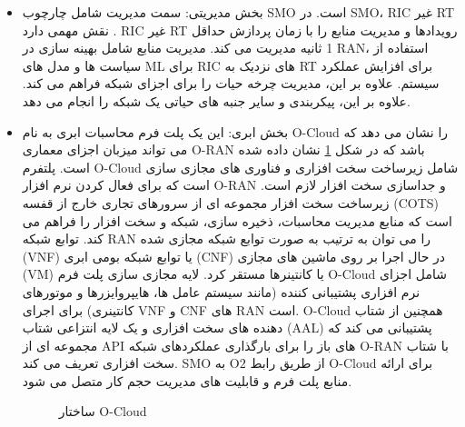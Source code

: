 \begin{itemize}
\item بخش مدیریتی:
سمت مدیریت شامل چارچوب SMO است. در SMO، RIC غیر RT نقش مهمی دارد \cite{ORANArch}.
RIC غیر RT رویدادها و مدیریت منابع را با زمان پردازش حداقل 1 ثانیه مدیریت می کند. مدیریت منابع شامل
بهینه سازی در RAN، استفاده از سیاست ها و مدل های ML برای RIC های نزدیک به RT برای افزایش عملکرد سیستم.
علاوه بر این، مدیریت چرخه حیات را برای اجزای شبکه فراهم می کند. علاوه بر این، پیکربندی و سایر جنبه های حیاتی یک شبکه را انجام می دهد.
\item بخش ابری:
این یک پلت فرم محاسبات ابری به نام O-Cloud را نشان می دهد که می تواند میزبان اجزای معماری O-RAN باشد که در شکل \ref{fig:g12} نشان داده شده است.
پلتفرم O-Cloud شامل زیرساخت سخت افزاری و فناوری های مجازی سازی است که برای فعال کردن نرم افزار O-RAN و جداسازی سخت افزار \cite{ORANSecOcloud} لازم است. زیرساخت سخت افزار مجموعه ای از سرورهای تجاری خارج از قفسه (COTS) است که منابع مدیریت محاسبات، ذخیره سازی، شبکه و سخت افزار را فراهم می کند.
توابع شبکه RAN را می توان به ترتیب به صورت توابع شبکه مجازی شده (VNF) یا توابع شبکه بومی ابری (CNF) در حال اجرا بر روی ماشین های مجازی (VM) یا کانتینرها مستقر کرد. لایه مجازی سازی پلت فرم O-Cloud شامل اجزای نرم افزاری پشتیبانی کننده (مانند سیستم عامل ها، هایپروایزرها و موتورهای کانتینری) برای اجرای VNF و CNF های RAN است.
O-Cloud همچنین از شتاب دهنده های سخت افزاری و یک لایه انتزاعی شتاب (AAL) پشتیبانی می کند که مجموعه ای از API های باز را برای بارگذاری عملکردهای شبکه O-RAN با شتاب سخت افزاری تعریف می کند.
SMO از طریق رابط $\text{O}2$ به O-Cloud برای ارائه منابع پلت فرم و قابلیت های مدیریت حجم کار \cite{ORANArch} متصل می شود.
\begin{figure}
	\centering
	\caption{ ساختار O-Cloud}
	\label{fig:g12}
\end{figure}

\end{itemize}

